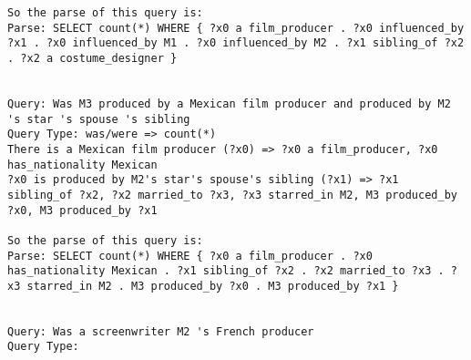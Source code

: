 \documentclass{article} \usepackage{iclr2022_conference,times}
\begin{document}
\begin{lstlisting}
So the parse of this query is:
Parse: SELECT count(*) WHERE { ?x0 a film_producer . ?x0 influenced_by ?x1 . ?x0 influenced_by M1 . ?x0 influenced_by M2 . ?x1 sibling_of ?x2 . ?x2 a costume_designer }


Query: Was M3 produced by a Mexican film producer and produced by M2 's star 's spouse 's sibling
Query Type: was/were => count(*)
There is a Mexican film producer (?x0) => ?x0 a film_producer, ?x0 has_nationality Mexican
?x0 is produced by M2's star's spouse's sibling (?x1) => ?x1 sibling_of ?x2, ?x2 married_to ?x3, ?x3 starred_in M2, M3 produced_by ?x0, M3 produced_by ?x1

So the parse of this query is:
Parse: SELECT count(*) WHERE { ?x0 a film_producer . ?x0 has_nationality Mexican . ?x1 sibling_of ?x2 . ?x2 married_to ?x3 . ?x3 starred_in M2 . M3 produced_by ?x0 . M3 produced_by ?x1 }


Query: Was a screenwriter M2 's French producer
Query Type:
\end{lstlisting}
\end{document}
